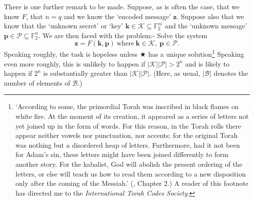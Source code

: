 \documentclass[12pt,a4paper]{article}
\theoremstyle{plain}
\theoremstyle{definition}
\begin{document}
    There is one further remark to be made.
    Suppose, as is often the case, that
    we know $F$, that $n=q$
    and we know the `encoded message'
    ${\mathbf z}$. Suppose also
    that we know that the `unknown secret' or `key'
    ${\mathbf k}\in \mathcal{K}\subseteq {\mathbb F}_{2}^{m}$
    and the
    `unknown message'
    ${\mathbf p}\in \mathcal{P}\subseteq {\mathbb F}_{2}^{n}$.
    We are then faced with the problem:-
    Solve the system
    \begin{equation*}
    {\mathbf z}
        =F({\mathbf k},{\mathbf p})
        \ \text{where}\ {\mathbf k}\in \mathcal{K},
        \  {\mathbf p}\in \mathcal{P}. \tag*{$\bigstar$}
    \end{equation*}
    Speaking roughly, the task is
    hopeless unless $\bigstar$ has a unique
    solution\footnote{`According to some, the primordial
    Torah was inscribed in black flames on white fire.
    At the moment of its creation, it appeared as a series
    of letters not yet joined up in the form of words.
    For this reason, in the Torah rolls there appear neither
    vowels nor punctuation, nor accents; for the original
    Torah was nothing but a disordered heap of letters.
    Furthermore, had it not been for Adam's sin, these letters
    might have been joined differently to form
    another story. For the kabalist, God will abolish the
    present ordering of the letters, or else will teach us
    how to read them according to a new disposition
    only after the coming of the Messiah.' (\cite{Eco}, Chapter 2.)
    A reader of this footnote has directed me to the
    \emph{International Torah Codes Society}.}
    Speaking even more roughly, this is unlikely to happen
    if $|\mathcal{K}||\mathcal{P}|>2^{n}$ and is
    likely to happen if $2^{n}$ is substantially
    greater than $|\mathcal{K}||\mathcal{P}|$.
    (Here, as usual, $|\mathcal{B}|$
    denotes the number of elements of $\mathcal{B}$.)
\end{document}
